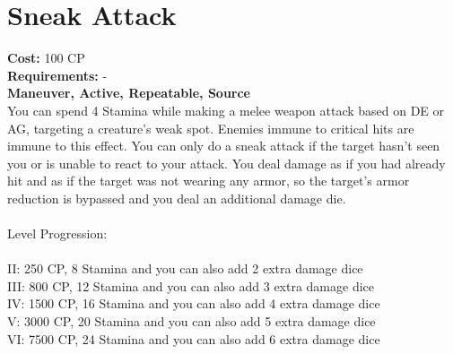 \section{Sneak Attack}
\textbf{Cost:} 100 CP\\
\textbf{Requirements:} -\\
\textbf{Maneuver, Active, Repeatable, Source}\\
You can spend 4 Stamina while making a melee weapon attack based on DE or AG, targeting a creature’s weak spot. Enemies immune to critical hits are immune to this effect. You can only do a sneak attack if the target hasn’t seen you or is unable to react to your attack. You deal damage as if you had already hit and as if the target was not wearing any armor, so the target’s armor reduction is bypassed and you deal an additional damage die.\\
\\
Level Progression:\\
\\
II: 250 CP, 8 Stamina and you can also add 2 extra damage dice\\
III: 800 CP, 12 Stamina and you can also add 3 extra damage dice\\
IV: 1500 CP, 16 Stamina and you can also add 4 extra damage dice\\
V: 3000 CP, 20 Stamina and you can also add 5 extra damage dice\\
VI: 7500 CP, 24 Stamina and you can also add 6 extra damage dice\\